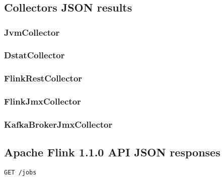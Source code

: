 \appendix

\chapter{}

\section{Collectors JSON results}
\subsection{JvmCollector}
\subsection{DstatCollector}
\subsection{FlinkRestCollector}
\subsection{FlinkJmxCollector}
\subsection{KafkaBrokerJmxCollector}

\section{Apache Flink 1.1.0 API JSON responses}
\verb|GET /jobs|

